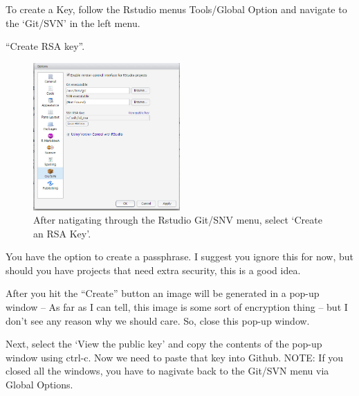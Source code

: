 \documentclass[12pt]{../SOP4_alpha}\usepackage[]{graphicx}\usepackage[]{color}
\begin{document}
\NP To create a Key, follow the Rstudio menus Tools/Global Option and navigate to the `Git/SVN' in the left menu.

\NP ``Create RSA key''. 

\begin{figure}
\centering
\includegraphics[width=0.5\textwidth]{graphics/CreatingSSH.jpg}
\caption{After natigating through the Rstudio Git/SNV menu, select `Create an RSA Key'.}
\end{figure}

\NP You have the option to create a passphrase. I suggest you ignore this for now, but should you have projects that need extra security, this is a good idea.

\NP After you hit the ``Create'' button an image will be generated in a pop-up window -- As far as I can tell, this image is some sort of encryption thing -- but I don't see any reason why we should care. So, close this pop-up window. 

\NP Next, select the `View the public key' and copy the contents of the pop-up window using ctrl-c. Now we need to paste that key into Github. NOTE: If you closed all the windows, you have to nagivate back to the Git/SVN menu via Global Options. 
\end{document}
